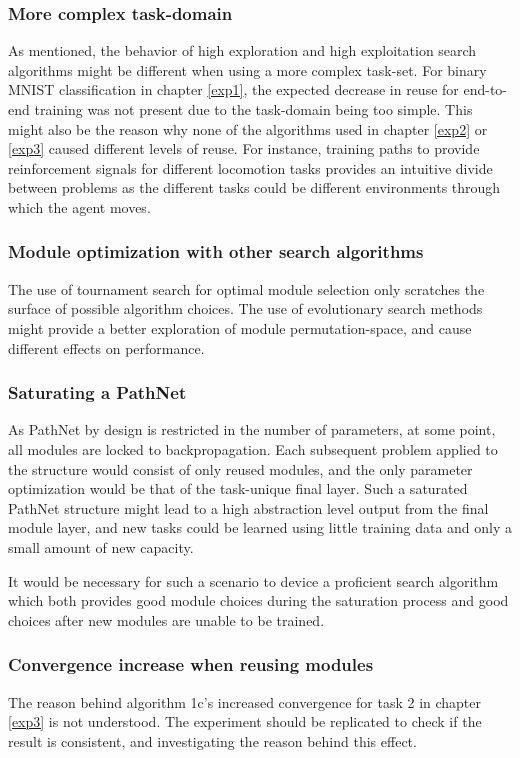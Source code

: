 \subsubsection{More complex task-domain}
As mentioned, the behavior of high exploration and high exploitation search algorithms might be different when using a more complex task-set. For binary MNIST classification in chapter \ref{exp1}, the expected decrease in reuse for end-to-end training was not present due to the task-domain being too simple. This might also be the reason why none of the algorithms used in chapter \ref{exp2} or \ref{exp3} caused different levels of reuse. For instance, training paths to provide reinforcement signals for different locomotion tasks provides an intuitive divide between problems as the different tasks could be different environments through which the agent moves.   

\subsubsection{Module optimization with other search algorithms}
The use of tournament search for optimal module selection only scratches the surface of possible algorithm choices. The use of evolutionary search methods might provide a better exploration of module permutation-space, and cause different effects on performance. 

\subsubsection{Saturating a PathNet}
As PathNet by design is restricted in the number of parameters, at some point, all modules are locked to backpropagation. Each subsequent problem applied to the structure would consist of only reused modules, and the only parameter optimization would be that of the task-unique final layer. Such a saturated PathNet structure might lead to a high abstraction level output from the final module layer, and new tasks could be learned using little training data and only a small amount of new capacity. 

It would be necessary for such a scenario to device a proficient search algorithm which both provides good module choices during the saturation process and good choices after new modules are unable to be trained. 

\subsubsection{Convergence increase when reusing modules}
The reason behind algorithm 1c's increased convergence for task 2 in chapter \ref{exp3} is not understood. The experiment should be replicated to check if the result is consistent, and investigating the reason behind this effect. 

